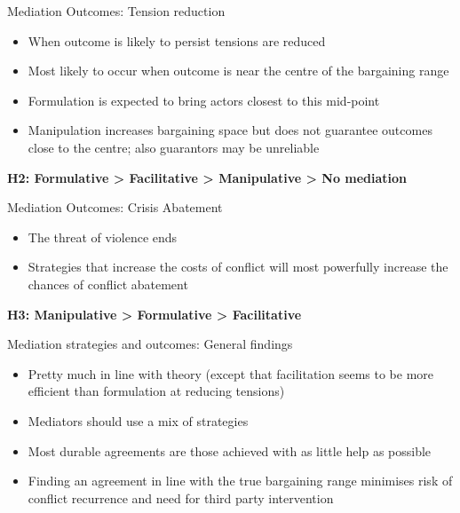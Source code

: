 \documentclass[xcolor=table,usenames,dvipsnames]{beamer}
\begin{document}
\begin{frame}{Mediation Outcomes: Tension reduction}
\begin{itemize}
\item When outcome is likely to persist tensions are reduced
\item Most likely to occur when outcome is near the centre of the bargaining range
\item Formulation is expected to bring actors closest to this mid-point
\item Manipulation increases bargaining space but does not guarantee outcomes close to the centre; also guarantors may be unreliable  \pause
\end{itemize}

\textbf{H2: Formulative > Facilitative > Manipulative > No mediation}
\end{frame}

\begin{frame}{Mediation Outcomes: Crisis Abatement}
\begin{itemize}
\item The threat of violence ends
\item Strategies that increase the costs of conflict will most powerfully increase the chances of conflict abatement  \pause
\end{itemize}

\textbf{H3: Manipulative > Formulative > Facilitative}
\end{frame}

\begin{frame}{Mediation strategies and outcomes: General findings}
\begin{itemize}
\item Pretty much in line with theory (except that facilitation seems to be more efficient than formulation at reducing tensions) \pause
\item Mediators should use a mix of strategies \pause
\item Most durable agreements are those achieved with as little help as possible \pause
\item Finding an agreement in line with the true bargaining range minimises risk of conflict recurrence and need for third party intervention
\end{itemize}
\end{frame}
\end{document}
